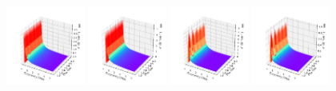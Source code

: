 \documentclass[a4paper]{article}
\begin{document}
\begin{figure}[H]
  \centering
  \includegraphics[width=0.23\textwidth]{cond3d_imag-A2-v5-imp0.pdf}
  \includegraphics[width=0.23\textwidth]{cond3d_imag-A2-v5-imp1.pdf}
  \includegraphics[width=0.23\textwidth]{cond3d_imag-A2-v5-imp2.pdf}
  \includegraphics[width=0.23\textwidth]{cond3d_imag-A2-v5-imp3.pdf}
\end{figure}
\end{document}
